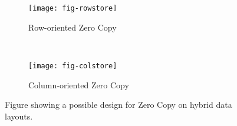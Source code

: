 \begin{figure}[H]
    \centering
    \begin{subfigure}[t]{0.4\textwidth}
        \centering
        \texttt{[image: fig-rowstore]}
        \caption{Row-oriented Zero Copy}
    \end{subfigure}%
    ~ 
    \begin{subfigure}[t]{0.4\textwidth}
        \centering
        \texttt{[image: fig-colstore]}
        \caption{Column-oriented Zero Copy}
    \end{subfigure}
    \caption{Figure showing a possible design for Zero Copy on hybrid data layouts.}
\label{fig:rowstore-colstore}
\end{figure}
